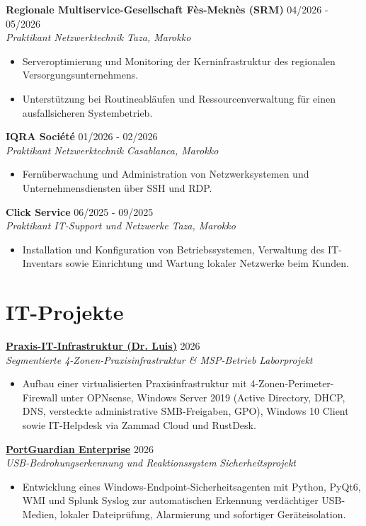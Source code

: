 \documentclass[10pt,a4paper]{article}
\newcommand{\cvheading}[4]{
  \textbf{#1} \hfill #2 \\[0.08em]
  \textit{#3} \hfill \textit{#4}
}
\newcommand{\cvheadinglink}[5]{
  \textbf{\href{#5}{#1}} \hfill #2 \\[0.08em]
  \textit{#3} \hfill \textit{#4}
}
\begin{document}
\cvheading{Regionale Multiservice-Gesellschaft Fès-Meknès (SRM)}{04/2026 - 05/2026}{Praktikant Netzwerktechnik}{Taza, Marokko}
\begin{itemize}
  \item Serveroptimierung und Monitoring der Kerninfrastruktur des regionalen Versorgungsunternehmens.
  \item Unterstützung bei Routineabläufen und Ressourcenverwaltung für einen ausfallsicheren Systembetrieb.
\end{itemize}

\cvheading{IQRA Société}{01/2026 - 02/2026}{Praktikant Netzwerktechnik}{Casablanca, Marokko}
\begin{itemize}
  \item Fernüberwachung und Administration von Netzwerksystemen und Unternehmensdiensten über SSH und RDP.
\end{itemize}

\cvheading{Click Service}{06/2025 - 09/2025}{Praktikant IT-Support und Netzwerke}{Taza, Marokko}
\begin{itemize}
  \item Installation und Konfiguration von Betriebssystemen, Verwaltung des IT-Inventars sowie Einrichtung und Wartung lokaler Netzwerke beim Kunden.
\end{itemize}

\section*{IT-Projekte}
\cvheadinglink{Praxis-IT-Infrastruktur (Dr. Luis)}{2026}{Segmentierte 4-Zonen-Praxisinfrastruktur \& MSP-Betrieb}{Laborprojekt}{https://grydsh.dev/de/dental-clinic.html}
\begin{itemize}
  \item Aufbau einer virtualisierten Praxisinfrastruktur mit 4-Zonen-Perimeter-Firewall unter OPNsense, Windows Server 2019 (Active Directory, DHCP, DNS, versteckte administrative SMB-Freigaben, GPO), Windows 10 Client sowie IT-Helpdesk via Zammad Cloud und RustDesk.
\end{itemize}

\cvheadinglink{PortGuardian Enterprise}{2026}{USB-Bedrohungserkennung und Reaktionssystem}{Sicherheitsprojekt}{https://grydsh.dev/de/portguardian.html}
\begin{itemize}
  \item Entwicklung eines Windows-Endpoint-Sicherheitsagenten mit Python, PyQt6, WMI und Splunk Syslog zur automatischen Erkennung verdächtiger USB-Medien, lokaler Dateiprüfung, Alarmierung und sofortiger Geräteisolation.
\end{itemize}
\end{document}
